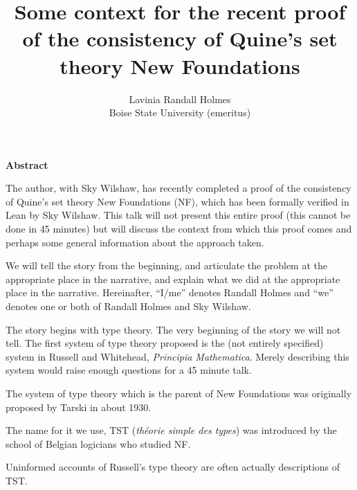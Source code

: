 \documentclass{slides}
\title{Some context for the recent proof of the consistency of Quine’s set theory New Foundations}
\author{Lavinia Randall Holmes \\ Boise State University (emeritus)}
\begin{document}
\maketitle

\begin{slide}
 
 {\bf Abstract}
 
 The author, with Sky Wilshaw, has recently completed a proof of the consistency of Quine’s set theory New Foundations (NF), which has been formally verified in Lean by Sky Wilshaw. This talk will not present this entire proof (this cannot be done in 45 minutes) but will discuss the context from which this proof comes and perhaps some general information about the approach taken.

\end{slide}

\begin{slide}

We will tell the story from the beginning, and articulate the problem at the appropriate place in the narrative,
and explain what we did at the appropriate place in the narrative.  Hereinafter, ``I/me'' denotes Randall Holmes
and ``we'' denotes one or both of Randall Holmes and Sky Wilshaw.

\end{slide}

\begin{slide}

The story begins with type theory.  The very beginning of the story we will not tell.  The first system of type theory proposed is the (not entirely specified) system in Russell and Whitehead, {\em Principia Mathematica\/}.  Merely describing this system would raise enough questions for a 45 minute talk.

\end{slide}

\begin{slide}

The system of type theory which is the parent of New Foundations was originally proposed by Tarski in about 1930. 

The name for it we use, TST ({\em th\'eorie simple des types\/}) was introduced by the school of Belgian logicians who studied NF.

Uninformed accounts of Russell's type theory are often actually descriptions of TST.

\end{slide}
\end{document}
